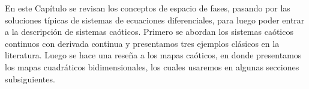 En este Capítulo se revisan los conceptos de espacio de fases, pasando por las soluciones típicas de sistemas de ecuaciones diferenciales, para luego poder entrar a la descripción de sistemas caóticos. Primero se abordan los sistemas caóticos continuos con derivada continua y presentamos tres ejemplos clásicos en la literatura. Luego se hace una reseña a los mapas caóticos, en donde presentamos los mapas cuadráticos bidimensionales, los cuales usaremos en algunas secciones subsiguientes.
